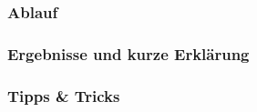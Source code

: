 \subsubsection*{Ablauf}




\subsubsection*{Ergebnisse und kurze Erklärung}




\subsubsection*{Tipps \& Tricks}
